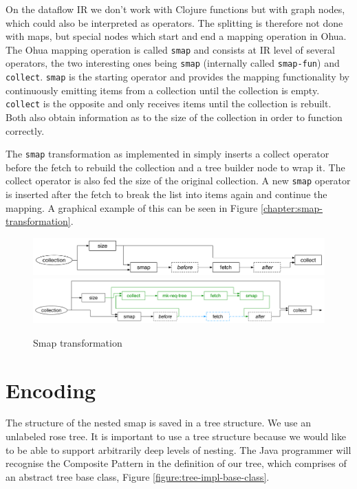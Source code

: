 On the dataflow IR we don't work with Clojure functions but with graph nodes, which could also be interpreted as operators.
The splitting is therefore not done with maps, but special nodes which start and end a mapping operation in Ohua.
The Ohua mapping operation is called \texttt{smap} and consists at IR level of several operators, the two interesting ones being \texttt{smap} (internally called \texttt{smap-fun}) and \texttt{collect}.
\texttt{smap} is the starting operator and provides the mapping functionality by continuously emitting items from a collection until the collection is empty.
\texttt{collect} is the opposite and only receives items until the collection is rebuilt.
Both also obtain information as to the size of the collection in order to function correctly.

The \texttt{smap} transformation as implemented in \yauhau{} simply inserts a collect operator before the fetch to rebuild the collection and a tree builder node to wrap it.
The collect operator is also fed the size of the original collection.
A new \texttt{smap} operator is inserted after the fetch to break the list into items again and continue the mapping.
A graphical example of this can be seen in Figure \ref{chapter:smap-transformation}.

\begin{figure}[h]
	\includegraphics[width=.5\textwidth]{Figures/smap-rewrite-original}
	\includegraphics[width=.5\textwidth]{Figures/smap-rewrite}
	\label{figure:smap-transformation}
	\caption{Smap transformation}
\end{figure}

\section{Encoding}

The structure of the nested smap is saved in a tree structure.
We use an unlabeled rose tree.
It is important to use a tree structure because we would like to be able to support arbitrarily deep levels of nesting.
The Java programmer will recognise the Composite Pattern in the definition of our tree, which comprises of an abstract tree base class, Figure \ref{figure:tree-impl-base-class}.

